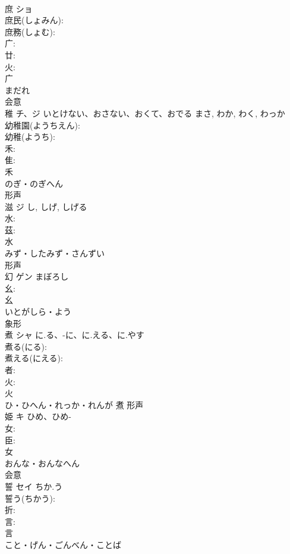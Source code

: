 \documentclass[8pt]{extreport}
\begin{document}
\begin{CJK}{UTF8}{min}
\\	庶	ショ			
\\	庶民(しょみん): 
\\	庶務(しょむ): 
\\	广: 
\\	廿: 
\\	火: 
\\	广	
\\	まだれ	
\\	会意 
\\	稚	チ、ジ	いとけない、おさない、おくて、おでる	まさ, わか, わく, わっか	
\\	幼稚園(ようちえん): 
\\	幼稚(ようち): 
\\	禾: 
\\	隹: 
\\	禾	
\\	のぎ・のぎへん	
\\	形声 
\\	滋	ジ		し, しげ, しげる	
\\	水: 
\\	茲: 
\\	水	
\\	みず・したみず・さんずい	
\\	形声 
\\	幻	ゲン	まぼろし		
\\	幺: 
\\	幺	
\\	いとがしら・よう	
\\	象形 
\\	煮	シャ	に.る、-に、に.える、に.やす		
\\	煮る(にる): 
\\	煮える(にえる): 
\\	者: 
\\	火: 
\\	火	
\\	ひ・ひへん・れっか・れんが	煮	形声 
\\	姫	キ	ひめ、ひめ-		
\\	女: 
\\	臣: 
\\	女	
\\	おんな・おんなへん	
\\	会意 
\\	誓	セイ	ちか.う		
\\	誓う(ちかう): 
\\	折: 
\\	言: 
\\	言	
\\	こと・げん・ごんべん・ことば	

\end{CJK}
\end{document}
